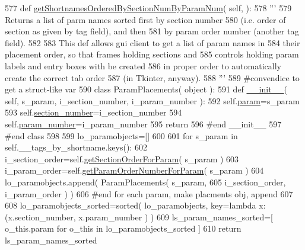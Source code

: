 \begin{DoxyCode}
577     \textcolor{keyword}{def }\hyperlink{classnegui_1_1pgparamset_1_1PGParamSet_a4f1aab0d1de87fbf66ea057e3577804c}{getShortnamesOrderedBySectionNumByParamNum}( self, ):
578         \textcolor{stringliteral}{'''}
579 \textcolor{stringliteral}{        Returns a list of parm names sorted first by section number}
580 \textcolor{stringliteral}{        (i.e. order of section as given by tag field), and then }
581 \textcolor{stringliteral}{        by param order number (another tag field). }
582 \textcolor{stringliteral}{}
583 \textcolor{stringliteral}{        This def allows gui client to get a list of param names in }
584 \textcolor{stringliteral}{        their placement order, so that frames holding sections and}
585 \textcolor{stringliteral}{        controls holding param labels and entry boxes with be created}
586 \textcolor{stringliteral}{        in proper order to automatically create the correct tab order}
587 \textcolor{stringliteral}{        (in Tkinter, anyway).}
588 \textcolor{stringliteral}{        '''}
589         \textcolor{comment}{#convendice to get a struct-like var}
590         \textcolor{keyword}{class }ParamPlacements( object ):
591             \textcolor{keyword}{def }\hyperlink{classnegui_1_1pgparamset_1_1PGParamSet_a598ea6a166f56fe5be01f86d4d8c91ba}{\_\_init\_\_}( self, s\_param, i\_section\_number, i\_param\_number ):
592                 self.\hyperlink{classnegui_1_1pgparamset_1_1PGParamSet_a51a7d3fde3da41e93f0c9f538ccd0edf}{param}=s\_param
593                 self.\hyperlink{classnegui_1_1pgparamset_1_1PGParamSet_a04420e446c9dd25d5d88fd62a734cb6e}{section\_number}=i\_section\_number
594                 self.\hyperlink{classnegui_1_1pgparamset_1_1PGParamSet_ab9fca9825029bbe54878b4b6f32c75c7}{param\_number}=i\_param\_number
595                 \textcolor{keywordflow}{return}
596             \textcolor{comment}{#end \_\_init\_\_}
597         \textcolor{comment}{#end class}
598 
599         lo\_paramobjects=[]
600 
601         \textcolor{keywordflow}{for} s\_param \textcolor{keywordflow}{in} self.\_\_tags\_by\_shortname.keys():
602             i\_section\_order=self.\hyperlink{classnegui_1_1pgparamset_1_1PGParamSet_a18000b825994a6784da5ead88e300e98}{getSectionOrderForParam}( s\_param )
603             i\_param\_order=self.\hyperlink{classnegui_1_1pgparamset_1_1PGParamSet_a5eccd6863398ff156943e9f3dd3c2b4c}{getParamOrderNumberForParam}( s\_param )
604             lo\_paramobjects.append( ParamPlacements( s\_param, 
605                                     i\_section\_order, i\_param\_order ) )
606         \textcolor{comment}{#end for each param, make placments obj, append}
607 
608         lo\_paramobjects\_sorted=sorted( lo\_paramobjects, key=\textcolor{keyword}{lambda} x: (x.section\_number, x.param\_number ) )
609         ls\_param\_names\_sorted=[ o\_this.param \textcolor{keywordflow}{for} o\_this \textcolor{keywordflow}{in} lo\_paramobjects\_sorted ]
610         \textcolor{keywordflow}{return} ls\_param\_names\_sorted
\end{DoxyCode}
